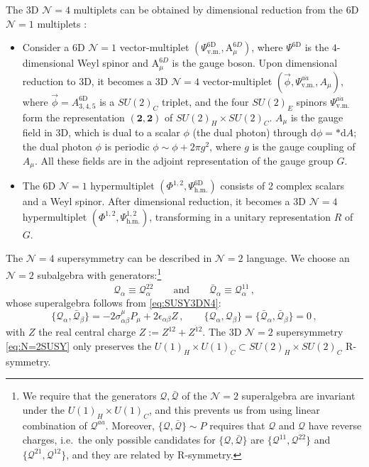 \documentclass[12pt,a4paper]{article}
\renewcommand{\(}{\left(}
\renewcommand{\)}{\right)}
\renewcommand{\(}{\left(}
\renewcommand{\)}{\right)}
\begin{document}
\medskip
 
The 3D $\mathcal{N}=4$ multiplets can be obtained by dimensional reduction from the 6D $\mathcal{N}=1$ multiplets \cite{Seiberg:1996nz}: 
\begin{itemize}
\item  Consider a 6D $\mathcal{N}=1$ vector-multiplet $(\Psi^{\textrm{6D}}_{\textrm{v.m.}}, \textrm{A}^{6D}_\mu)$, where $\Psi^{\textrm{6D}} $ is the $4$-dimensional Weyl spinor and $\textrm{A}^{6D}_\mu$ is the gauge boson. 
Upon dimensional reduction to 3D, it becomes a 3D $\mathcal{N}=4$ vector-multiplet $(\vec{\phi}, \Psi^{a\dot{a}}_{\textrm{v.m.}},A_{\mu})$, where $\vec{\phi}=A^{\textrm{6D}}_{3,4,5}$ is a $SU(2)_C$ triplet, and the four $SU(2)_E$ spinors $\Psi^{a\dot{a}}_{\textrm{v.m.}}$ form the representation $(\mathbf{2}, \mathbf{2})$ of $SU(2)_{H}\times SU(2)_C$. $A_{\mu}$ is the gauge field in 3D, which is dual to a scalar $\phi$ (the dual photon) through $\mathrm{d}\phi=*\mathrm{d}A$; 
the dual photon $\phi$ is periodic $\phi\sim \phi+2\pi g^2$, where $g$ is the gauge coupling of $A_\mu$. 
All these fields are in the adjoint representation of the gauge group $G$.
		
\item The 6D $\mathcal{N}=1$ hypermultiplet $(\Phi^{1,2}, \Psi^{\textrm{6D}}_{\textrm{h.m.}})$ consists of 2 complex scalars and a Weyl spinor. 
After dimensional reduction, it becomes a 3D $\mathcal{N}=4$ hypermultiplet $(\Phi^{1,2}, \Psi^{\dot{1},\dot{2}}_{\textrm{h.m.}})$, transforming in a unitary representation $R$ of $G$. 
\end{itemize}

\medskip

The $\mathcal{N}=4$ supersymmetry can be described in $\mathcal{N}=2$ language. 
We choose an $\mathcal{N}=2$ subalgebra with generators:\footnote{We require that the generators $\mathcal{Q},\bar{\mathcal{Q}}$ of the $\mathcal{N}=2$ superalgebra are invariant under the $U(1)_H\times U(1)_C$, and this prevents us from using linear combination of $\mathcal{Q}^{a\dot{a}}$. 
Moreover, $\{\mathcal{Q},\bar{\mathcal{Q}}\}\sim P$ requires that $\mathcal{Q}$ and $\mathcal{Q}$ have reverse charges, i.e.\ the only possible candidates for $\{\mathcal{Q},\bar{\mathcal{Q}}\}$ are $\{\mathcal{Q}^{1\dot{1}},\mathcal{Q}^{2\dot{2}}\}$ and $\{\mathcal{Q}^{2\dot{1}},\mathcal{Q}^{1\dot{2}}\}$, and they are related by R-symmetry.}
\begin{equation}\label{eq:N=2SUSY}
\mathcal{Q}_{\alpha}\equiv  \mathcal{Q}^{2\dot{2}}_{\alpha}  
\qquad \textrm{and}\qquad
\bar{\mathcal{Q}}_{\alpha}\equiv \mathcal{Q}^{1\dot{1}}_{\alpha}\,,
\end{equation}
whose superalgebra follows from \eqref{eq:SUSY3DN4}:
\begin{equation}
\{\mathcal{Q}_\alpha,\bar{\mathcal{Q}}_\beta\}=-2\sigma^\mu_{\alpha\beta}P_\mu+2\epsilon_{\alpha\beta}Z \,,\qquad\{\mathcal{Q}_\alpha,\mathcal{Q}_\beta\}=\{\bar{\mathcal{Q}}_\alpha,\bar{\mathcal{Q}}_\beta\}=0\,,
\end{equation}
with $Z$ the real central charge $Z:=Z^{12}+Z^{\dot{1}\dot{2}}$.
The 3D $\mathcal{N}=2$ supersymmetry \eqref{eq:N=2SUSY} only preserves the $U(1)_H\times U(1)_C \subset SU(2)_H\times SU(2)_C$ R-symmetry. 
	
\end{document}
